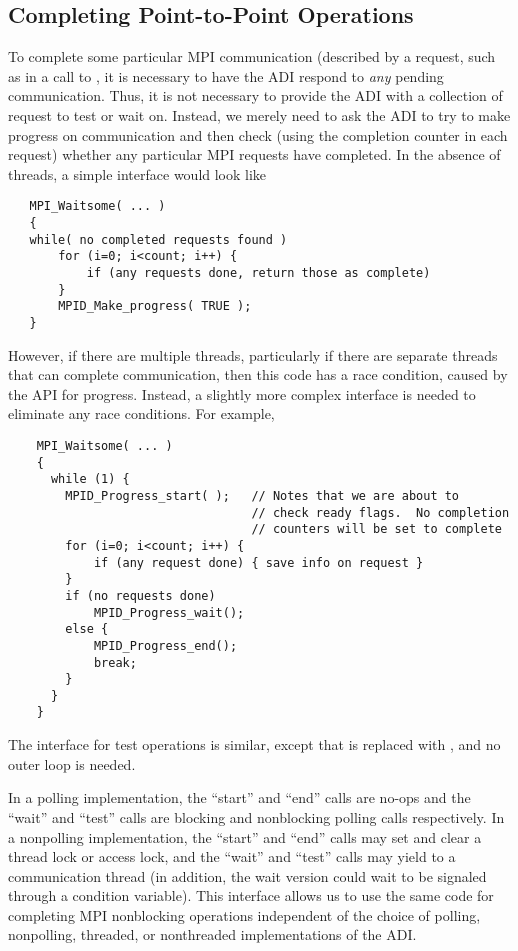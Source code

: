 
\subsection{Completing Point-to-Point Operations}

To complete some particular MPI communication (described by a request,
such as in a call to , it is necessary to have the ADI
respond to \emph{any} pending communication.  Thus, it is not
necessary to provide the ADI with a collection of request to test or
wait on.  Instead, we merely need to ask the ADI to try to make
progress on communication and then check (using the completion counter
in each request) whether any particular MPI requests have completed.
In the absence of threads, a simple interface would look like
\begin{verbatim}
   MPI_Waitsome( ... )
   {
   while( no completed requests found ) 
       for (i=0; i<count; i++) {
           if (any requests done, return those as complete)
       }
       MPID_Make_progress( TRUE );
   }
\end{verbatim}
However, if there are multiple threads, particularly if there are
separate threads that can complete communication,
then this code has a race condition, caused by the API for progress.
Instead, a slightly more complex interface is needed to
eliminate any race conditions.  For example,
\begin{verbatim}
    MPI_Waitsome( ... )
    {
      while (1) {
        MPID_Progress_start( );   // Notes that we are about to
                                  // check ready flags.  No completion
                                  // counters will be set to complete
        for (i=0; i<count; i++) {
            if (any request done) { save info on request }
        }
        if (no requests done) 
            MPID_Progress_wait();
        else {
            MPID_Progress_end();
            break;
        }
      }
    }
\end{verbatim}
The interface for test operations is similar, except that
 is replaced with ,
and no outer loop is needed.

In a polling implementation, the ``start'' and ``end'' calls are
no-ops and the ``wait'' and ``test'' calls are blocking and
nonblocking polling calls respectively.  In a nonpolling
implementation, the ``start'' and ``end'' calls may set and clear a thread lock
or access lock, and the ``wait'' and ``test'' calls may yield to a
communication thread (in addition, the wait version could wait to be
signaled through a condition variable).  This interface allows us to
use the same code for completing MPI nonblocking operations
independent of the choice of polling, nonpolling, threaded, or
nonthreaded implementations of the ADI.

